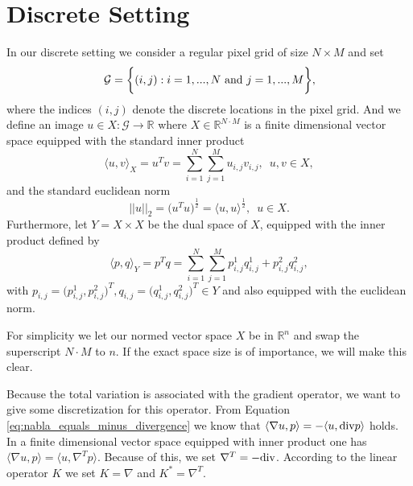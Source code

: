 \section{Discrete Setting} %
\label{sec:discrete_setting}

    In our discrete setting we consider a regular pixel grid of size $N \times M$ and set
        \begin{equation}
            \mathcal{G} = \bigg\{ (i, j) : i = 1, ..., N \,\, \textnormal{and} \,\, j = 1, ..., M \bigg\},
            \label{eq:pixel_grid}
        \end{equation}
    where the indices $(i, j)$ denote the discrete locations in the pixel grid. And we define an image $u \in X: \mathcal{G} \longrightarrow \mathbb{R}$ where $X \in \mathbb{R}^{N \cdot M}$ is a finite dimensional vector space equipped with the standard inner product
        \begin{equation}
            \langle u, v \rangle_{X} = u^{T}v = \sum_{i = 1}^{N} \sum_{j = 1}^{M} u_{i, j} v_{i, j}, \,\,\, u, v \in X,
            \label{eq:inner_product}
        \end{equation}
    and the standard euclidean norm
        $$
            ||u||_{2} = \big( u^{T} u \big)^{\frac{1}{2}} = \langle u, u \rangle^{\frac{1}{2}}, \,\,\, u \in X.
        $$
    Furthermore, let $Y = X \times X$ be the dual space of $X$, equipped with the inner product defined by
        $$
            \langle p, q \rangle_{Y} = p^{T}q = \sum_{i = 1}^{N} \sum_{j = 1}^{M} p^{1}_{i, j} q^{1}_{i, j} + p^{2}_{i, j} q^{2}_{i, j},
        $$
    with $p_{i, j} = \big(p^{1}_{i, j}, p^{2}_{i, j}\big)^{T}, q_{i, j} = \big(q^{1}_{i, j}, q^{2}_{i, j}\big)^{T} \in Y$ and also equipped with the euclidean norm.

    For simplicity we let our normed vector space $X$ be in $\mathbb{R}^{n}$ and swap the superscript $N \cdot M$ to $n$. If the exact space size is of importance, we will make this clear.

    Because the total variation is associated with the gradient operator, we want to give some discretization for this operator. From Equation \ref{eq:nabla_equals_minus_divergence} we know that $\langle \nabla u, p \rangle = - \langle u, \textnormal{div}p \rangle$ holds. In a finite dimensional vector space equipped with inner product one has $\langle \nabla u, p \rangle = \langle u, \nabla^{T} p \rangle$. Because of this, we set $\nabla^{T} = -\textnormal{div}$. According to the linear operator $K$ we set $K = \nabla$ and $K^{\ast} = \nabla^{T}$.

